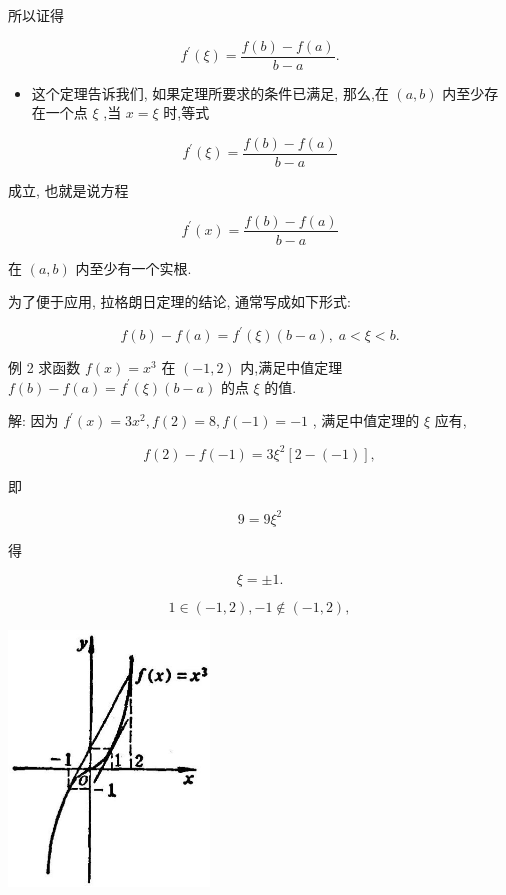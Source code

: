\documentclass[10pt]{article}
\begin{document}
所以证得

\[
{f}^{\prime }\left( \xi \right) = \frac{f\left( b\right) - f\left( a\right) }{b - a}.
\]

\begin{itemize}
\item 这个定理告诉我们, 如果定理所要求的条件已满足, 那么,在 \(\left( {a,b}\right)\) 内至少存在一个点 \(\xi\) ,当 \(x = \xi\) 时,等式
\end{itemize}

\[
{f}^{\prime }\left( \xi \right) = \frac{f\left( b\right) - f\left( a\right) }{b - a}
\]

成立, 也就是说方程

\[
{f}^{\prime }\left( x\right) = \frac{f\left( b\right) - f\left( a\right) }{b - a}
\]

在 \(\left( {a,b}\right)\) 内至少有一个实根.

为了便于应用, 拉格朗日定理的结论, 通常写成如下形式:

\[
f\left( b\right) - f\left( a\right) = {f}^{\prime }\left( \xi \right) \left( {b - a}\right) ,\;a < \xi < b.
\]

例 2 求函数 \(f\left( x\right) = {x}^{3}\) 在 \(\left( {-1,2}\right)\) 内,满足中值定理 \(f\left( b\right) - f\left( a\right) = {f}^{\prime }\left( \xi \right) \left( {b - a}\right)\) 的点 \(\xi\) 的值.

解: 因为 \({f}^{\prime }\left( x\right) = 3{x}^{2},f\left( 2\right) = 8,f\left( {-1}\right) = - 1\) , 满足中值定理的 \(\xi\) 应有,

\[
f\left( 2\right) - f\left( {-1}\right) = 3{\xi }^{2}\left\lbrack {2 - \left( {-1}\right) }\right\rbrack ,
\]

即

\[
9 = 9{\xi }^{2}
\]

得

\[
\xi = \pm 1\text{.}
\]

\[
1 \in \left( {-1,2}\right) , - 1 \notin \left( {-1,2}\right) ,
\]

\begin{center}
\includegraphics[max width=0.4\textwidth]{images/01912c18-5c3f-733d-b775-749ba9897a9d_135_695444.jpg}
\end{center}
\end{document}
